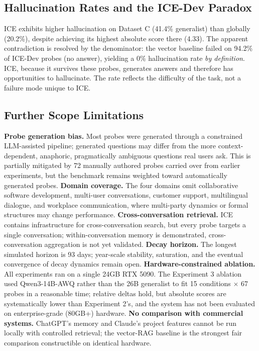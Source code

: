 \documentclass[11pt,a4paper]{article}
\begin{document}
\subsection{Hallucination Rates and the ICE-Dev Paradox}
ICE exhibits higher hallucination on Dataset C (41.4\% generalist) than globally (20.2\%), despite achieving its highest absolute score there (4.33). The apparent contradiction is resolved by the denominator: the vector baseline failed on 94.2\% of ICE-Dev probes (no answer), yielding a 0\% hallucination rate \emph{by definition}. ICE, because it survives these probes, generates answers and therefore has opportunities to hallucinate. The rate reflects the difficulty of the task, not a failure mode unique to ICE.

\subsection{Further Scope Limitations}
\textbf{Probe generation bias.} Most probes were generated through a constrained LLM-assisted pipeline; generated questions may differ from the more context-dependent, anaphoric, pragmatically ambiguous questions real users ask. This is partially mitigated by 72 manually authored probes carried over from earlier experiments, but the benchmark remains weighted toward automatically generated probes. \textbf{Domain coverage.} The four domains omit collaborative software development, multi-user conversations, customer support, multilingual dialogue, and workplace communication, where multi-party dynamics or formal structures may change performance. \textbf{Cross-conversation retrieval.} ICE contains infrastructure for cross-conversation search, but every probe targets a single conversation; within-conversation memory is demonstrated, cross-conversation aggregation is not yet validated. \textbf{Decay horizon.} The longest simulated horizon is 93 days; year-scale stability, saturation, and the eventual convergence of decay dynamics remain open. \textbf{Hardware-constrained ablation.} All experiments ran on a single 24GB RTX 5090. The Experiment 3 ablation used Qwen3-14B-AWQ rather than the 26B generalist to fit 15 conditions $\times$ 67 probes in a reasonable time; relative deltas hold, but absolute scores are systematically lower than Experiment 2's, and the system has not been evaluated on enterprise-grade (80GB+) hardware. \textbf{No comparison with commercial systems.} ChatGPT's memory and Claude's project features cannot be run locally with controlled retrieval; the vector-RAG baseline is the strongest fair comparison constructible on identical hardware.
\end{document}
